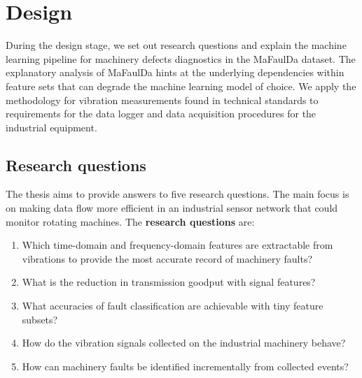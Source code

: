 \chapter{Design} \label{chapter:design}
During the design stage, we set out research questions and explain the machine learning pipeline for machinery defects diagnostics in the MaFaulDa dataset. The explanatory analysis of MaFaulDa hints at the underlying dependencies within feature sets that can degrade the machine learning model of choice. We apply the methodology for vibration measurements found in technical standards to requirements for the data logger and data acquisition procedures for the industrial equipment.

\section{Research questions}
The thesis aims to provide answers to five research questions. The main focus is on making data flow more efficient in an industrial sensor network that could monitor rotating machines. The \textbf{research questions} are:
\begin{enumerate}[label=RQ\arabic*., font=\bfseries]
    \itemsep0pt
	\item Which time-domain and frequency-domain features are extractable from vibrations to provide the most accurate record of machinery faults?
	\item What is the reduction in transmission goodput with signal features?
	\item What accuracies of fault classification are achievable with tiny feature subsets?
	\item How do the vibration signals collected on the industrial machinery behave?
	\item How can machinery faults be identified incrementally from collected events?
\end{enumerate}

